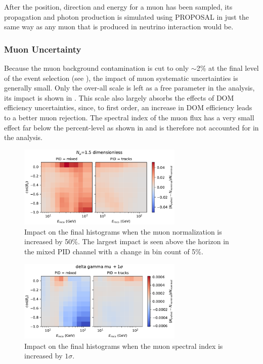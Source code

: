 After the position, direction and energy for a muon has been sampled, its propagation and photon production is simulated using \textsc{PROPOSAL} in just the same way as any muon that is produced in neutrino interaction would be.

\subsubsection{Muon Uncertainty}
\label{sec:atm-muons-systematic}
Because the muon background contamination is cut to only $\sim$2\% at the final level of the event selection (see ), the impact of muon systematic uncertainties is generally small. Only the over-all scale is left as a free parameter in the analysis, its impact is shown in . This scale also largely absorbs the effects of DOM efficiency uncertainties, since, to first order, an increase in DOM efficiency leads to a better muon rejection. The spectral index of the muon flux has a very small effect far below the percent-level as shown in  and is therefore not accounted for in the analysis.

\begin{figure}
    \centering
    \includegraphics[width=0.7\textwidth,trim={0 0 0 0.6cm},clip]{figures/measurement/systematics/muons/weight_scale.pdf}
    \caption{Impact on the final histograms when the muon normalization is increased by 50\%. The largest impact is seen above the horizon in the mixed PID channel with a change in bin count of 5\%.}
    \label{fig:weight-scale-syst}
\end{figure}

\begin{figure}
    \centering
    \includegraphics[width=0.7\textwidth,trim={0 0 0 0.6cm},clip]{figures/measurement/systematics/muons/delta_gamma_mu.pdf}
    \caption{Impact on the final histograms when the muon spectral index is increased by $1\sigma$.}
    \label{fig:delta-gamma-mu-syst}
\end{figure}

